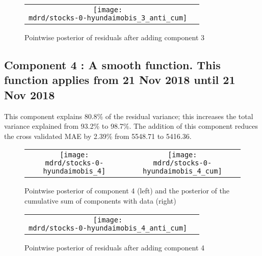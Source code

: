 \documentclass{article} %
\begin{document}
\begin{figure}[H]
\newcommand{\wmgd}{0.5\columnwidth}
\newcommand{\hmgd}{3.0cm}
\newcommand{\mdrd}{stocks-0-hyundaimobis}
\newcommand{\mbm}{\hspace{-0.3cm}}
\begin{tabular}{cc}
\mbm \texttt{[image: \\mdrd/stocks-0-hyundaimobis\_3\_anti\_cum]}
\end{tabular}
\caption{Pointwise posterior of residuals after adding component 3}
\label{fig:comp3}
\end{figure}

\subsection{Component 4 : A smooth function. This function applies from 21 Nov 2018 until 21 Nov 2018}



This component explains 80.8\% of the residual variance; this increases the total variance explained from 93.2\% to 98.7\%.
The addition of this component reduces the cross validated MAE by 2.39\% from 5548.71 to 5416.36.


\begin{figure}[H]
\newcommand{\wmgd}{0.5\columnwidth}
\newcommand{\hmgd}{3.0cm}
\newcommand{\mdrd}{stocks-0-hyundaimobis}
\newcommand{\mbm}{\hspace{-0.3cm}}
\begin{tabular}{cc}
\mbm \texttt{[image: \\mdrd/stocks-0-hyundaimobis\_4]} & \texttt{[image: \\mdrd/stocks-0-hyundaimobis\_4\_cum]}
\end{tabular}
\caption{Pointwise posterior of component 4 (left) and the posterior of the cumulative sum of components with data (right)}
\label{fig:comp4}
\end{figure}

\begin{figure}[H]
\newcommand{\wmgd}{0.5\columnwidth}
\newcommand{\hmgd}{3.0cm}
\newcommand{\mdrd}{stocks-0-hyundaimobis}
\newcommand{\mbm}{\hspace{-0.3cm}}
\begin{tabular}{cc}
\mbm \texttt{[image: \\mdrd/stocks-0-hyundaimobis\_4\_anti\_cum]}
\end{tabular}
\caption{Pointwise posterior of residuals after adding component 4}
\label{fig:comp4}
\end{figure}
\end{document}
